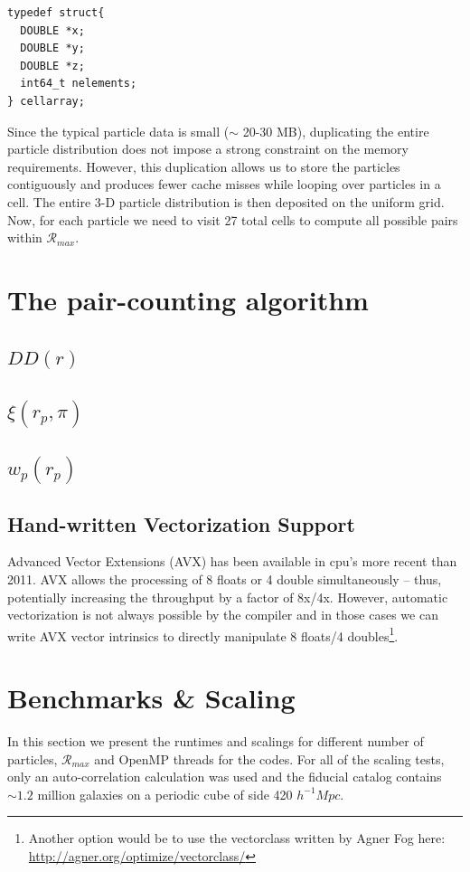 \documentclass[preprint, 12pt, authoryear]{elsarticle}
\newcommand{\hMpc}{\ensuremath{{h^{-1}Mpc}\xspace}}
\newcommand{\rmax}{\ensuremath{{{\mathcal{R}}_{max}}}\xspace}
\newcommand{\xir}{\ensuremath{{DD(r)}}\xspace}
\newcommand{\wprp}{\ensuremath{{w_p(r_p)}}\xspace}
\newcommand{\xirppi}{\ensuremath{{\xi(r_p,\pi)}}\xspace}
\begin{document}
\begin{lstlisting}
typedef struct{
  DOUBLE *x;
  DOUBLE *y;
  DOUBLE *z;
  int64_t nelements;
} cellarray;
\end{lstlisting}

Since the typical particle data is small ($\sim$ 20-30 MB), duplicating the entire particle distribution does not impose a strong 
constraint on the memory requirements. However, this duplication allows us to store the particles contiguously and produces fewer 
cache misses while looping over particles in a cell. 
The entire 3-D particle distribution is then deposited on the uniform grid. Now, for each particle we need to visit 27 total cells to 
compute all possible pairs within \rmax. 

\section{The pair-counting algorithm}

\subsection{\xir}
\subsection{\xirppi}
\subsection{\wprp}
\subsection{}

\subsection{Hand-written Vectorization Support}
Advanced Vector Extensions (AVX) has been available in cpu's more recent than 2011. AVX allows the processing of 8 floats or 4 double simultaneously -- thus, 
potentially increasing the throughput by a factor of 8x/4x. However, automatic vectorization is not always possible by the compiler and in those cases 
we can write AVX vector intrinsics to directly manipulate 8 floats/4 doubles\footnote{Another option would be to use the vectorclass written by Agner Fog here: \url{http://agner.org/optimize/vectorclass/}}. 

\section{Benchmarks \& Scaling}
In this section we present the runtimes and scalings for different number of particles, \rmax and OpenMP threads for the codes. 
For all of the scaling tests, only an auto-correlation calculation was used and the fiducial catalog contains $\sim 1.2$ million 
galaxies on a periodic cube of side 420 \hMpc. 
\end{document}
